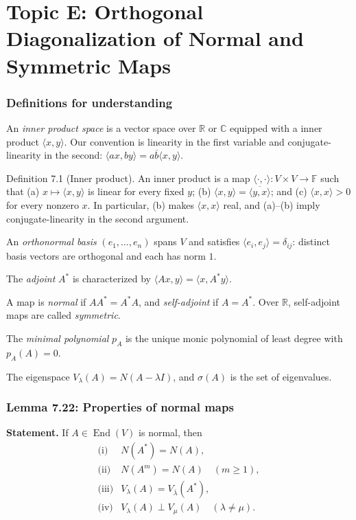 \documentclass[11pt,a4paper]{article}
\begin{document}
\clearpage
\part*{Topic E: Orthogonal Diagonalization of Normal and Symmetric Maps}
\section*{Definitions for understanding}
An \emph{inner product space} is a vector space over \(\mathbb R\) or \(\mathbb C\) equipped with a inner product \(\langle x,y\rangle\). Our convention is linearity in the first variable and conjugate-linearity in the second:
\(\langle ax,by\rangle=a\overline b\langle x,y\rangle\).

Definition 7.1 (Inner product). An inner product is a map \(\langle\cdot,\cdot\rangle:V\times V\to\mathbb F\) such that (a) \(x\mapsto\langle x,y\rangle\) is linear for every fixed \(y\); (b) \(\langle x,y\rangle=\overline{\langle y,x\rangle}\); and (c) \(\langle x,x\rangle>0\) for every nonzero \(x\). In particular, (b) makes \(\langle x,x\rangle\) real, and (a)--(b) imply conjugate-linearity in the second argument.

An \emph{orthonormal basis} \((e_1,\ldots,e_n)\) spans \(V\) and satisfies \(\langle e_i,e_j\rangle=\delta_{ij}\): distinct basis vectors are orthogonal and each has norm \(1\).

The \emph{adjoint} \(A^*\) is characterized by
\(\langle Ax,y\rangle{=}\langle x,A^*y\rangle\).


A map is \emph{normal} if \(AA^*=A^*A\), and \emph{self-adjoint} if \(A=A^*\). Over \(\mathbb R\), self-adjoint maps are called \emph{symmetric}.


The \emph{minimal polynomial} \(p_A\) is the unique monic polynomial of least degree with \(p_A(A)=0\).


The eigenspace \(V_\lambda(A)=N(A-\lambda I)\), and \(\sigma(A)\) is the set of eigenvalues.

\section{Lemma 7.22: Properties of normal maps}
\textbf{Statement.} If \(A\in\operatorname{End}(V)\) is normal, then
\[
\begin{array}{ll}
\text{(i)}&N(A^*)=N(A),\\
\text{(ii)}&N(A^m)=N(A)\quad(m\geq1),\\
\text{(iii)}&V_\lambda(A)=V_{\overline\lambda}(A^*),\\
\text{(iv)}&V_\lambda(A)\perp V_\mu(A)\quad(\lambda\neq\mu).
\end{array}
\]
\end{document}

